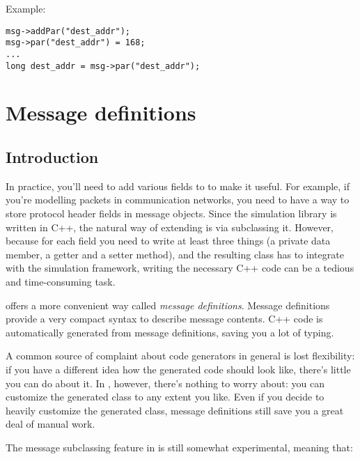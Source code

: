 Example:

\begin{verbatim}
msg->addPar("dest_addr");
msg->par("dest_addr") = 168;
...
long dest_addr = msg->par("dest_addr");
\end{verbatim}



\section{Message definitions}
\label{ch:messages:message-definitions}

\subsection{Introduction}

In practice, you'll need to add various fields to  to
make it useful. For example, if you're modelling packets in communication
networks, you need to have a way to store protocol header fields in message
objects. Since the simulation library is written in C++, the natural way
of extending  is via subclassing it.
However, because for each field you need to write at least
three things (a private data member, a getter and a setter method),
and the resulting class has to integrate with the simulation framework,
writing the necessary C++ code can be a tedious and time-consuming task.

{\opp} offers a more convenient way called \textit{message definitions}.
Message definitions provide a very compact syntax to describe
message contents. C++ code is automatically generated from message
definitions, saving you a lot of typing.

A common source of complaint about code generators in general is
lost flexibility: if you have a different idea how the generated
code should look like, there's little you can do about it.
In {\opp}, however, there's nothing to worry about: you can
customize the generated class to any extent you like.
Even if you decide to heavily customize the generated class,
message definitions still save you a great deal of manual work.

The message subclassing feature in {\opp} is still somewhat experimental,
meaning that:

